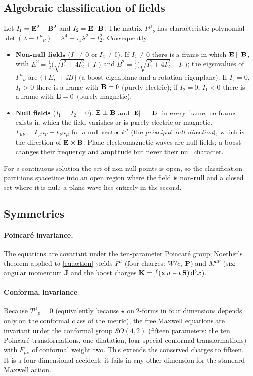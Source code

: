 \subsection{Algebraic classification of fields}

Let $I_1=\mathbf{E}^2-\mathbf{B}^2$ and $I_2=\mathbf{E}\cdot\mathbf{B}$.  The matrix
$F^\mu{}_\nu$ has characteristic polynomial
$\det(\lambda-F^\mu{}_\nu)=\lambda^4-I_1\lambda^2-I_2^2$.  Consequently:
\begin{itemize}
\item \textbf{Non-null fields} ($I_1\ne0$ or $I_2\ne0$).  If $I_2\neq0$ there is a frame in which
  $\mathbf{E}\parallel\mathbf{B}$, with
  $E^2=\tfrac12\big(\sqrt{I_1^2+4I_2^2}+I_1\big)$ and
  $B^2=\tfrac12\big(\sqrt{I_1^2+4I_2^2}-I_1\big)$; the eigenvalues of
  $F^\mu{}_\nu$ are $\{\pm E,\ \pm\ii B\}$ (a boost eigenplane and a
  rotation eigenplane).  If $I_2=0$, $I_1>0$ there is a frame with
  $\mathbf{B}=0$ (purely electric); if $I_2=0$, $I_1<0$ there is a frame with
  $\mathbf{E}=0$ (purely magnetic).
\item \textbf{Null fields} ($I_1=I_2=0$): $\mathbf{E}\perp\mathbf{B}$ and $|\mathbf{E}|=|\mathbf{B}|$ in
  every frame; no frame exists in which the field vanishes or is purely
  electric or magnetic.  $F_{\mu\nu}=k_\mu a_\nu-k_\nu a_\mu$ for a null
  vector $k^\mu$ (the \emph{principal null direction}), which is the
  direction of $\mathbf{E}\times\mathbf{B}$.  Plane electromagnetic waves are null
  fields; a boost changes their frequency and amplitude but never their
  null character.
\end{itemize}
For a continuous solution the set of non-null points is open, so the
classification partitions spacetime into an open region where the field
is non-null and a closed set where it is null; a plane wave lies
entirely in the second.

\subsection{Symmetries}

\paragraph{Poincaré invariance.}  The equations are covariant under the ten-parameter
Poincaré group; Noether's theorem applied to \eqref{eq:action} yields
$P^\mu$ (four charges: $W/c,\ \mathbf P$) and $M^{\mu\nu}$ (six:
angular momentum $\mathbf J$ and the boost charges
$\mathbf K=\int(\mathbf{x}\,u-t\,\mathbf{S})\,\mathrm{d}^3x$).

\paragraph{Conformal invariance.}  Because $T^\mu{}_\mu=0$ (equivalently
because $\star$ on 2-forms in four dimensions depends only on the
conformal class of the metric), the free Maxwell equations are invariant under
the conformal group $SO(4,2)$ (fifteen parameters: the ten Poincaré
transformations, one dilatation, four special conformal transformations)
with $F_{\mu\nu}$ of conformal weight two.  This extends the conserved
charges to fifteen.  It is a four-dimensional accident: it fails
in any other dimension for the standard Maxwell action.

